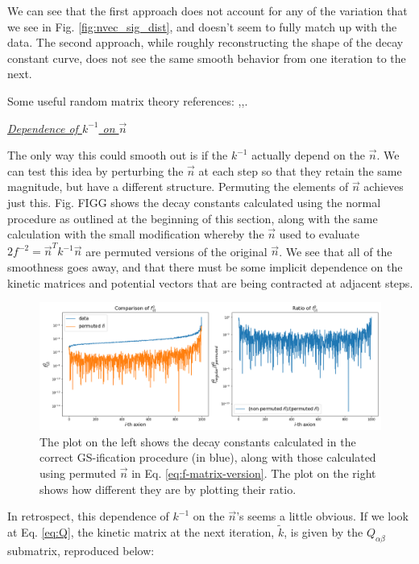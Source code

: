 \documentclass[11pt]{article}
\begin{document}
We can see that the first approach does not account for any of the variation that we see in Fig. \ref{fig:nvec_sig_dist}, and doesn't seem to fully match up with the data. The second approach, while roughly reconstructing the shape of the decay constant curve, does not see the same smooth behavior from one iteration to the next.

Some useful random matrix theory references: \cite{Livan_2018},\cite{WignerMPThms},\cite{RMTguide}.

\begin{center}
    \noindent \underline{\textit{Dependence of $k^{-1}$ on $\vec{n}$}}
\end{center}

The only way this could smooth out is if the $k^{-1}$ actually depend on the $\vec{n}$. We can test this idea by perturbing the $\vec{n}$ at each step so that they retain the same magnitude, but have a different structure. Permuting the elements of $\vec{n}$ achieves just this. Fig. FIGG shows the decay constants calculated using the normal procedure as outlined at the beginning of this section, along with the same calculation with the small modification whereby the $\vec{n}$ used to evaluate $2f^{-2}=\vec{n}^Tk^{-1}\vec{n}$ are permuted versions of the original $\vec{n}$. We see that all of the smoothness goes away, and that there must be some implicit dependence on the kinetic matrices and potential vectors that are being contracted at adjacent steps.

\begin{figure}[h]
    \centering
    \includegraphics[width=0.95\linewidth]{figs/k-depends-on-n.png}
    \caption{The plot on the left shows the decay constants calculated in the correct GS-ification procedure (in blue), along with those calculated using permuted $\vec{n}$ in Eq. \eqref{eq:f-matrix-version}. The plot on the right shows how different they are by plotting their ratio.}
    \label{fig:permuted-n}
\end{figure}

In retrospect, this dependence of $k^{-1}$ on the $\vec{n}$'s seems a little obvious. If we look at Eq. \eqref{eq:Q}, the kinetic matrix at the next iteration, $\tilde{k}$, is given by the $Q_{\alpha\beta}$ submatrix, reproduced below:
\end{document}
